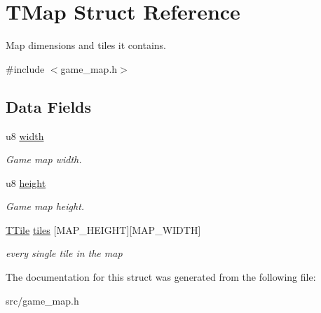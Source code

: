 \hypertarget{structTMap}{}\section{T\+Map Struct Reference}
\label{structTMap}


Map dimensions and tiles it contains.  




{\ttfamily \#include $<$game\+\_\+map.\+h$>$}

\subsection*{Data Fields}
\begin{DoxyCompactItemize}
\item 
u8 \mbox{\hyperlink{group__GameMap_ga2fe3dde5db57e2ec58a78ceb85ef1642}{width}}
\begin{DoxyCompactList}\small\item\em Game map width. \end{DoxyCompactList}\item 
u8 \mbox{\hyperlink{group__GameMap_ga62f0d660273fafe5b4f27ecc7f95456d}{height}}
\begin{DoxyCompactList}\small\item\em Game map height. \end{DoxyCompactList}\item 
\mbox{\hyperlink{structTTile}{T\+Tile}} \mbox{\hyperlink{group__GameMap_gac8050f8f059101f93288d8f4037531c9}{tiles}} \mbox{[}M\+A\+P\+\_\+\+H\+E\+I\+G\+HT\mbox{]}\mbox{[}M\+A\+P\+\_\+\+W\+I\+D\+TH\mbox{]}
\begin{DoxyCompactList}\small\item\em every single tile in the map \end{DoxyCompactList}\end{DoxyCompactItemize}


The documentation for this struct was generated from the following file\+:\begin{DoxyCompactItemize}
\item 
src/game\+\_\+map.\+h\end{DoxyCompactItemize}
